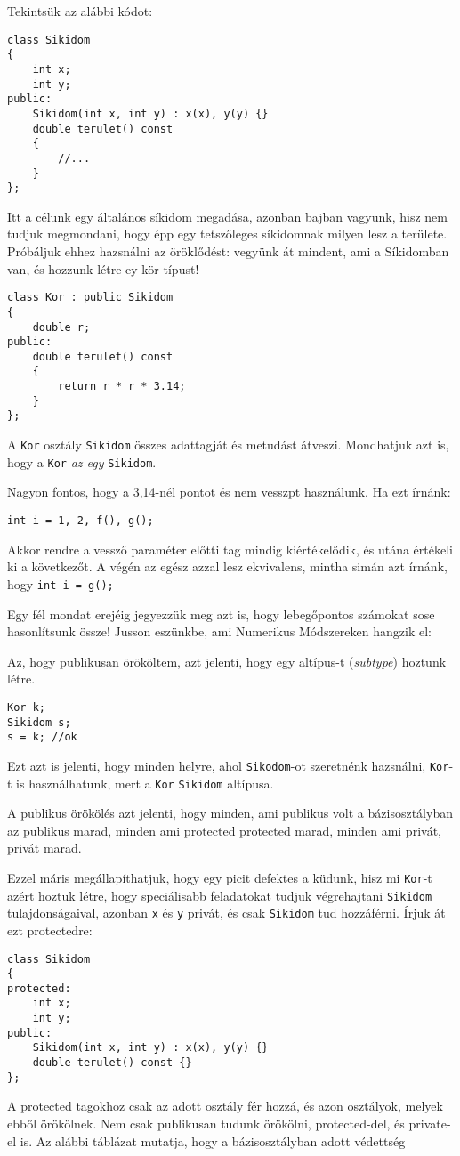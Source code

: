 \documentclass[a4paper,11.5pt]{article}
\begin{document}
	\medskip
	Tekintsük az alábbi kódot:
	\begin{lstlisting}
class Sikidom
{
	int x;
	int y;
public:
	Sikidom(int x, int y) : x(x), y(y) {}
	double terulet() const
	{
		//...
	}
};
	\end{lstlisting}
	Itt a célunk egy általános síkidom megadása, azonban bajban vagyunk, hisz nem tudjuk megmondani, hogy épp egy tetszőleges síkidomnak milyen lesz a területe. Próbáljuk ehhez hazsnálni az öröklődést: vegyünk át mindent, ami a Síkidomban van, és hozzunk létre ey kör típust!
	
	\begin{lstlisting}
class Kor : public Sikidom
{
	double r;
public:
	double terulet() const
	{
		return r * r * 3.14;
	}
};
	\end{lstlisting}
	A \texttt{Kor} osztály \texttt{Sikidom} összes adattagját és metudást átveszi. Mondhatjuk azt is, hogy a \texttt{Kor} \textit{az egy} \texttt{Sikidom}.
	\begin{note}
		Nagyon fontos, hogy a 3,14-nél pontot és nem vesszpt használunk. Ha ezt írnánk:
		
		{\centering \texttt{int i = 1, 2, f(), g();} \par}
		
		Akkor rendre a vessző paraméter előtti tag mindig kiértékelődik, és utána értékeli ki a következőt. A végén az egész azzal lesz ekvivalens, mintha simán azt írnánk, hogy \texttt{int i = g();}
		
		Egy fél mondat erejéig jegyezzük meg azt is, hogy lebegőpontos számokat sose hasonlítsunk össze! Jusson eszünkbe, ami Numerikus Módszereken hangzik el: 
	\end{note}
	Az, hogy publikusan örököltem, azt jelenti, hogy egy {altípus}-t (\textit{subtype}) hoztunk létre. 
	\begin{lstlisting}
Kor k;
Sikidom s;
s = k; //ok
	\end{lstlisting}
	Ezt azt is jelenti, hogy minden helyre, ahol \texttt{Sikodom}-ot szeretnénk hazsnálni, \texttt{Kor}-t is használhatunk, mert a \texttt{Kor} \texttt{Sikidom} altípusa.
	
	A publikus örökölés azt jelenti, hogy minden, ami publikus volt a bázisosztályban az publikus marad, minden ami protected protected marad, minden ami privát, privát marad.
	
	Ezzel máris megállapíthatjuk, hogy egy picit defektes a küdunk, hisz mi \texttt{Kor}-t azért hoztuk létre, hogy speciálisabb feladatokat tudjuk végrehajtani \texttt{Sikidom} tulajdonságaival, azonban \texttt{x} és \texttt{y} privát, és csak \texttt{Sikidom} tud hozzáférni. Írjuk át ezt protectedre:
\begin{lstlisting}
class Sikidom
{
protected:
	int x;
	int y;
public:
	Sikidom(int x, int y) : x(x), y(y) {}
	double terulet() const {}
};
\end{lstlisting}
	A protected tagokhoz csak az adott osztály fér hozzá, és azon osztályok, melyek ebből örökölnek. Nem csak publikusan tudunk örökölni, protected-del, és private-el is. Az alábbi táblázat mutatja, hogy a bázisosztályban adott védettség
	
\end{document}
